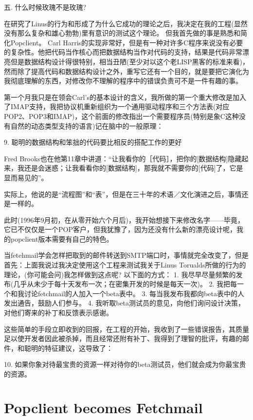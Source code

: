 \documentclass[a4paper,12pt,UTF8,twoside]{ctexbook}
\begin{document}
五. 什么时候玫瑰不是玫瑰?


在研究了Linus的行为和形成了为什么它成功的理论之后，我决定在我的工程(显然没有那么复杂和雄心勃勃)里有意识的测试这个理论。
但我首先做的事是熟悉和简化Popclient。 Carl Harris的实现非常好，但是有一种对许多C程序来说没有必要的复杂性。他把代码当作核心而把数据结构当作对代码的支持，结果是代码非常漂亮但是数据结构设计得很特别，相当丑陋(至少对以这个老LISP黑客的标准来看)，然而除了提高代码和数据结构设计之外，重写它还有一个目的，就是要把它演化为我彻底理解的东西，对修改你不理解的程序中的错误负责可不是一件有趣的事。


第一个月我只是在领会Carl's的基本设计的含义，我所做的第一个重大修改是加入了IMAP支持，我把协议机重新组织为一个通用驱动程序和三个方法表(对应POP2、POP3和IMAP)，这个前面的修改指出一个需要程序员(特别是象C这种没有自然的动态类型支持的语言)记在脑中的一般原理：


9. 聪明的数据结构和笨拙的代码要比相反的搭配工作的更好


Fred Brooks也在他第11章中讲道：“让我看你的［代码］，把你的[数据结构]隐藏起来，我还是会迷惑；让我看看你的[数据结构]，那我就不需要你的[代码]了，它是显而易见的”。


实际上，他说的是“流程图”和“表”，但是在三十年的术语／文化演进之后，事情还是一样的。


此时(1996年9月初，在从零开始六个月后)，我开始想接下来修改名字——毕竟，它已不仅仅是一个POP客户，但我犹豫了，因为还没有什么新的漂亮设计呢，我的popclient版本需要有自己的特色。


当fetehmail学会怎样把取到的邮件转送到SMTP端口时，事情就完全改变了，但是首先：上面我说过我决定使用这个工程来测试我关于Linus Torualds所做的行为的理论，(你可能会问)我怎样做到这点呢? 以下面的方式：
1. 我尽早尽量频繁的发布(几乎从未少于每十天发布一次；在密集开发的时候是每天一次)。
2. 我把每一个和我讨论fetchmail的人加入一个beta表中。
3. 每当我发布我都向beta表中的人发出通告，鼓励人们参与。
4. 我听取beta测试员的意见，向他们询问设计决策，对他们寄来的补丁和反馈表示感谢。


这些简单的手段立即收到的回报，在工程的开始，我收到了一些错误报告，其质量足以使开发者因此被杀掉，而且经常还附有补丁、我得到了理智的批评，有趣的邮件，和聪明的特征建议，这导致了：


10. 如果你象对待最宝贵的资源一样对待你的beta测试员，他们就会成为你最宝贵的资源。

\chapter{Popclient becomes Fetchmail}
\end{document}
